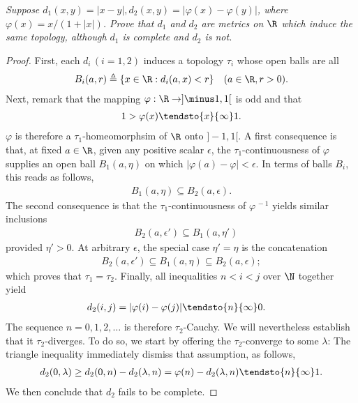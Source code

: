 \textit{Suppose %
%
  $d_1(x,y)=|x-y|, d_2(x,y)=|\varphi(x)-\varphi(y)|$, %
%
where %
%
  $\varphi(x)={x}/{(1+\lvert x \rvert )}$. %
%
Prove that $d_1$ and $d_2$ are metrics on $\R$ which induce the same %
topology, although $d_1$ is complete and $d_2$ is not.
}
\begin{proof}%
First, each $d_i\, (i=1, 2)$ induces a topology $\tau_i$ %
whose open balls are all %
%
\begin{align}\label{1_12_2}
  B_i(a,r) \triangleq \{x \in \R: d_i (a, x) < r \} 
  \quad (a \in \R, r > 0 ).
\end{align}
%
Next, remark that the mapping $\varphi: \R \to ]\minus 1, 1[$ is odd and that %
%
\begin{align}\label{1_12_1}
  1> \varphi(x) \tendsto{x}{\infty} 1.
\end{align}
%
$\varphi$ is therefore a $\tau_1$-homeomorphsim of $\R$ onto $]\minus 1, 1[$. %
%
A first consequence is that, at fixed $a \in \R$, given any positive scalar %
$\epsilon$, the $\tau_1$-continuousness of $\varphi$ supplies an open ball %
$B_1(a,\eta)$ on which $|\varphi(a)-\varphi|<\epsilon$. %
In terms of balls $B_i$, this reads as follows, %
%
\begin{align}
  B_1(a,\eta) \subseteq B_2(a,\epsilon).
\end{align}
%
The second consequence is that the $\tau_1$-continuousness of %
$\varphi^{\, \minus 1}$ yields similar inclusions %
%
\begin{align} \label{1_12_6}
\quad B_2(a, \epsilon') \subseteq B_1 (a, \eta')
\end{align}
%
provided $\eta'>0$. At arbitrary $\epsilon$, the special case $\eta' = \eta$ %
is the concatenation %
%
\begin{align}
  B_2(a, \epsilon') \subseteq B_1(a,\eta) \subseteq B_2(a,\epsilon); 
\end{align}
%
which proves that $\tau_1 =\tau_2$. %
%
Finally, all inequalities $n < i < j$ over $\N$ together yield %
%
\begin{align}
  d_2(i, j)=|\varphi(i)-\varphi(j)| \tendsto{n}{\infty} 0.
\quad \end{align}
%
The sequence $n=0, 1, 2, \dots$ is therefore $\tau_2$-Cauchy. We will %
nevertheless establish that it $\tau_2$-diverges. To do so, we start by %
offering the $\tau_2$-converge to some $\lambda$: %
The triangle inequality immediately dismiss that assumption, as follows, %
%
\begin{align}
  d_2(0, \lambda) \geq 
  d_2(0, n) - d_2(\lambda, n) = 
  \varphi(n) -d_2(\lambda, n)  \tendsto{n}{\infty} 1.
\end{align}
%
We then conclude that $d_2$ fails to be complete. 
\end{proof}
